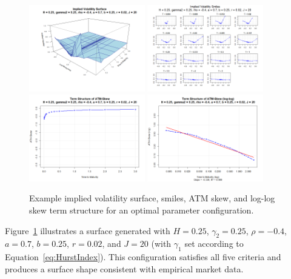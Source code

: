 \begin{figure}[H]
    \centering
    \includegraphics[width=0.45\textwidth]{figures/5.4 Optimal Parameter Ranges/optimal_example_iv_surface.png}
    \includegraphics[width=0.45\textwidth]{figures/5.4 Optimal Parameter Ranges/optimal_example_iv_smiles.png}
    \includegraphics[width=0.45\textwidth]{figures/5.4 Optimal Parameter Ranges/optimal_example_atm_skew.png}
    \includegraphics[width=0.45\textwidth]{figures/5.4 Optimal Parameter Ranges/optimal_example_atm_skew_log.png}
    \caption{Example implied volatility surface, smiles, ATM skew, and log-log skew term structure for an optimal parameter configuration.}
    \label{fig:OptimalExampleSurface}
\end{figure}

Figure~\ref{fig:OptimalExampleSurface} illustrates a surface generated with $H = 0.25$,  $\gamma_2 = 0.25$, $\rho = -0.4$, $a = 0.7$, $b = 0.25$, $r = 0.02$, and $J = 20$ (with $\gamma_1$ set according to Equation~\eqref{eq:HurstIndex}). This configuration satisfies all five criteria and produces a surface shape consistent with empirical market data.